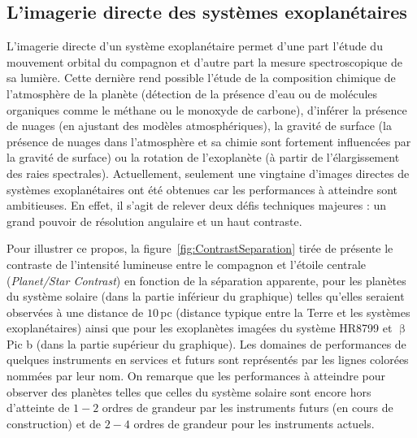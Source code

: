 \subsection{L'imagerie directe des systèmes exoplanétaires}
\label{sec:ImagerieDirecte}


L'imagerie directe d'un système exoplanétaire permet d'une part l'étude du mouvement orbital du compagnon \citep{chauvin2012, wang2018} et d'autre part la mesure spectroscopique de sa lumière. Cette dernière rend possible l'étude de la composition chimique de l'atmosphère de la planète (détection de la présence d'eau ou de molécules organiques comme le méthane ou le monoxyde de carbone), d'inférer la présence de nuages \citep{marley2015} (en ajustant des modèles atmosphériques), la gravité de surface \citep{marley2012} (la présence de nuages dans l'atmosphère et sa chimie sont fortement influencées par la gravité de surface) ou la rotation de l'exoplanète \citep{bryan2020} (à partir de l'élargissement des raies spectrales). Actuellement, seulement une vingtaine d'images directes de systèmes exoplanétaires ont été obtenues \citep{currie2022a} car les performances à atteindre sont ambitieuses. En effet, il s'agit de relever deux défis techniques majeures : un grand pouvoir de résolution angulaire et un haut contraste.

Pour illustrer ce propos, la figure~\ref{fig:ContrastSeparation} tirée de \cite{mawet2012} présente le contraste de l'intensité lumineuse entre le compagnon et l'étoile centrale (\textit{Planet/Star Contrast}) en fonction de la séparation apparente, pour les planètes du système solaire (dans la partie inférieur du graphique) telles qu'elles seraient observées à une distance de $10 \,$pc (distance typique entre la Terre et les systèmes exoplanétaires) ainsi que pour les exoplanètes imagées du système HR8799 \citep{marois2008} et $\upbeta$ Pic b \citep{lagrange2010} (dans la partie supérieur du graphique). Les domaines de performances de quelques instruments en services et futurs sont représentés par les lignes colorées nommées par leur nom. On remarque que les performances à atteindre pour observer des planètes telles que celles du système solaire sont encore hors d'atteinte de $1-2$ ordres de grandeur par les instruments futurs (en cours de construction) et de $2-4$ ordres de grandeur pour les instruments actuels.

